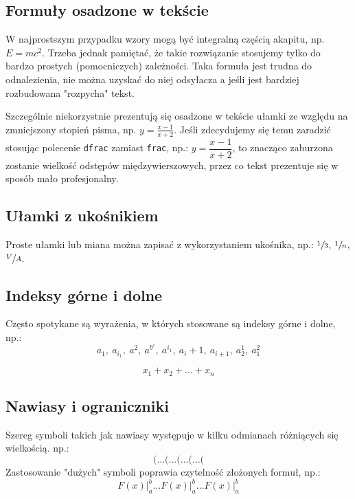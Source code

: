 \subsection{Formuły osadzone w tekście}
W najprostszym przypadku wzory mogą być integralną częścią akapitu, np. $E=mc^2$. Trzeba jednak pamiętać, że takie rozwiązanie stosujemy tylko do bardzo prostych (pomocniczych) zależności. Taka formuła jest trudna do odnalezienia, nie można uzyskać do niej odsyłacza a jeśli jest bardziej rozbudowana "rozpycha" tekst.

Szczególnie niekorzystnie  prezentują się osadzone w tekście ułamki ze względu na zmniejszony stopień pisma,  np. $y= \frac{x-1}{x+2}$. Jeśli zdecydujemy się temu zaradzić stosując polecenie \texttt{dfrac} zamiast \texttt{frac}, np.:  $y=\dfrac{x-1}{x+2}$, to znacząco zaburzona zostanie wielkość odstępów międzywierszowych, przez co tekst prezentuje się w sposób mało profesjonalny.

\subsection{Ułamki z ukośnikiem}
Proste ułamki lub miana można zapisać z wykorzystaniem ukośnika, np.: $\sfrac{1}{3}$, $\sfrac{1}{n}$, $\sfrac{V}{A}$.



\subsection{Indeksy górne i dolne}
Często spotykane są wyrażenia, w których stosowane są indeksy górne i dolne, np.:
\begin{equation}
a_{1},\ a_{i_{1}},\ a^{2},\ a^{b^{c}},\ a^{i_{1}},\
a_{i} + 1,\ a_{i + 1},\ a_{2}^{1},\ a^{2}_{1}
\end{equation}


\begin{equation}
x_{1} + x_{2} + \dots + x_{n}
\end{equation}


\subsection{Nawiasy i ograniczniki}
Szereg symboli takich jak nawiasy występuje w kilku odmianach różniących się wielkością. np.:
\[
( \dots \big( \dots \Big( \dots \bigg( \dots \Bigg(
\]
Zastosowanie "dużych" symboli poprawia czytelność złożonych formuł, np.: 
\[
F(x) |^{b}_{a} \dots
F(x) \bigr|^{b}_{a} \dots
F(x) \Bigr|^{b}_{a}
\]

